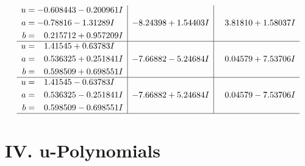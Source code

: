 \documentclass[1p]{elsarticle_modified}
\theoremstyle{definition}
\begin{document}
$$\begin{array}{c|c|c}
\begin{aligned}
u &= -0.608443 - 0.200961 I \\
a &= -0.78816 - 1.31289 I \\
b &= \phantom{-}0.215712 + 0.957209 I\end{aligned}
 & -8.24398 + 1.54403 I & \phantom{-}3.81810 + 1.58037 I \\ \hline\begin{aligned}
u &= \phantom{-}1.41545 + 0.63783 I \\
a &= \phantom{-}0.536325 + 0.251841 I \\
b &= \phantom{-}0.598509 + 0.698551 I\end{aligned}
 & -7.66882 - 5.24684 I & \phantom{-}0.04579 + 7.53706 I \\ \hline\begin{aligned}
u &= \phantom{-}1.41545 - 0.63783 I \\
a &= \phantom{-}0.536325 - 0.251841 I \\
b &= \phantom{-}0.598509 - 0.698551 I\end{aligned}
 & -7.66882 + 5.24684 I & \phantom{-}0.04579 - 7.53706 I\\
 \hline 
 \end{array}$$\newpage
\newpage\renewcommand{\arraystretch}{1}
\centering \section*{ IV. u-Polynomials}
\end{document}
